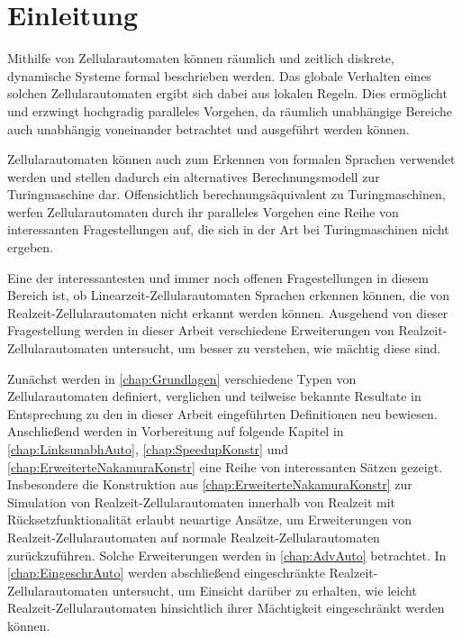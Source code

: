 \chapter{Einleitung}

Mithilfe von Zellularautomaten können räumlich und zeitlich diskrete, dynamische Systeme formal beschrieben werden.
Das globale Verhalten eines solchen Zellularautomaten ergibt sich dabei aus lokalen Regeln.
Dies ermöglicht und erzwingt hochgradig paralleles Vorgehen, da räumlich unabhängige Bereiche auch unabhängig voneinander betrachtet und ausgeführt werden können.

Zellularautomaten können auch zum Erkennen von formalen Sprachen verwendet werden und stellen dadurch ein alternatives Berechnungsmodell zur Turingmaschine dar.
Offensichtlich berechnungsäquivalent zu Turingmaschinen, werfen Zellularautomaten durch ihr paralleles Vorgehen eine Reihe von interessanten Fragestellungen auf,
die sich in der Art bei Turingmaschinen nicht ergeben.

Eine der interessantesten und immer noch offenen Fragestellungen in diesem Bereich ist,
ob Linearzeit-Zellularautomaten Sprachen erkennen können, die von Realzeit-Zellularautomaten nicht erkannt werden können.
Ausgehend von dieser Fragestellung werden in dieser Arbeit verschiedene Erweiterungen von Realzeit-Zellularautomaten untersucht,
um besser zu verstehen, wie mächtig diese sind.

Zunächst werden in \cref{chap:Grundlagen} verschiedene Typen von Zellularautomaten definiert, verglichen und teilweise bekannte Resultate
in Entsprechung zu den in dieser Arbeit eingeführten Definitionen neu bewiesen.
Anschließend werden in Vorbereitung auf folgende Kapitel in \cref{chap:LinksunabhAuto}, \cref{chap:SpeedupKonstr} und \cref{chap:ErweiterteNakamuraKonstr}
eine Reihe von interessanten Sätzen gezeigt.
Insbesondere die Konstruktion aus \cref{chap:ErweiterteNakamuraKonstr}
zur Simulation von Realzeit-Zellularautomaten innerhalb von Realzeit mit Rücksetzfunktionalität
erlaubt neuartige Ansätze, um Erweiterungen von Realzeit-Zellularautomaten auf normale Realzeit-Zellularautomaten zurückzuführen.
Solche Erweiterungen werden in \cref{chap:AdvAuto} betrachtet.
In \cref{chap:EingeschrAuto} werden abschließend eingeschränkte Realzeit-Zellularautomaten untersucht, um Einsicht darüber zu erhalten,
wie leicht Realzeit-Zellularautomaten hinsichtlich ihrer Mächtigkeit eingeschränkt werden können.

